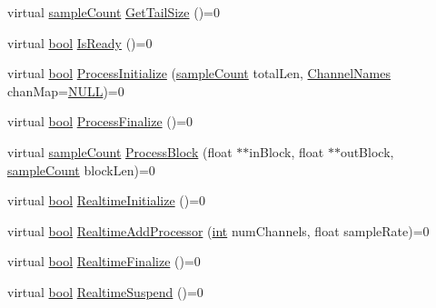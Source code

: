 \begin{DoxyCompactItemize}
virtual \hyperlink{include_2audacity_2_types_8h_afa427e1f521ea5ec12d054e8bd4d0f71}{sample\+Count} \hyperlink{class_effect_client_interface_af458b5b6cd1d733ff9aa03831ad4bd0d}{Get\+Tail\+Size} ()=0
\item 
virtual \hyperlink{mac_2config_2i386_2lib-src_2libsoxr_2soxr-config_8h_abb452686968e48b67397da5f97445f5b}{bool} \hyperlink{class_effect_client_interface_ac391a996fff511bc743b5eddc1438649}{Is\+Ready} ()=0
\item 
virtual \hyperlink{mac_2config_2i386_2lib-src_2libsoxr_2soxr-config_8h_abb452686968e48b67397da5f97445f5b}{bool} \hyperlink{class_effect_client_interface_a96d8cd5eab4cb8c079c041c53c18ea44}{Process\+Initialize} (\hyperlink{include_2audacity_2_types_8h_afa427e1f521ea5ec12d054e8bd4d0f71}{sample\+Count} total\+Len, \hyperlink{include_2audacity_2_types_8h_a4f0f42a04250c39bbe0ce6cb26aa3b48}{Channel\+Names} chan\+Map=\hyperlink{px__mixer_8h_a070d2ce7b6bb7e5c05602aa8c308d0c4}{N\+U\+LL})=0
\item 
virtual \hyperlink{mac_2config_2i386_2lib-src_2libsoxr_2soxr-config_8h_abb452686968e48b67397da5f97445f5b}{bool} \hyperlink{class_effect_client_interface_af1652ce2123dd4cfbe8c87abf311b31d}{Process\+Finalize} ()=0
\item 
virtual \hyperlink{include_2audacity_2_types_8h_afa427e1f521ea5ec12d054e8bd4d0f71}{sample\+Count} \hyperlink{class_effect_client_interface_a8cd59e504bbc8bde4e53b73a78ba20bd}{Process\+Block} (float $\ast$$\ast$in\+Block, float $\ast$$\ast$out\+Block, \hyperlink{include_2audacity_2_types_8h_afa427e1f521ea5ec12d054e8bd4d0f71}{sample\+Count} block\+Len)=0
\item 
virtual \hyperlink{mac_2config_2i386_2lib-src_2libsoxr_2soxr-config_8h_abb452686968e48b67397da5f97445f5b}{bool} \hyperlink{class_effect_client_interface_aebea4dc675276b36b76e6cc24515d498}{Realtime\+Initialize} ()=0
\item 
virtual \hyperlink{mac_2config_2i386_2lib-src_2libsoxr_2soxr-config_8h_abb452686968e48b67397da5f97445f5b}{bool} \hyperlink{class_effect_client_interface_a29cf03efb9c094ceadecf80cb83c26e0}{Realtime\+Add\+Processor} (\hyperlink{xmltok_8h_a5a0d4a5641ce434f1d23533f2b2e6653}{int} num\+Channels, float sample\+Rate)=0
\item 
virtual \hyperlink{mac_2config_2i386_2lib-src_2libsoxr_2soxr-config_8h_abb452686968e48b67397da5f97445f5b}{bool} \hyperlink{class_effect_client_interface_a1a8f7d2519fc2049f18e1b1781ca5ace}{Realtime\+Finalize} ()=0
\item 
virtual \hyperlink{mac_2config_2i386_2lib-src_2libsoxr_2soxr-config_8h_abb452686968e48b67397da5f97445f5b}{bool} \hyperlink{class_effect_client_interface_a2d0323dadd0f6a548d1e18c9596e7c38}{Realtime\+Suspend} ()=0

\end{DoxyCompactItemize}
